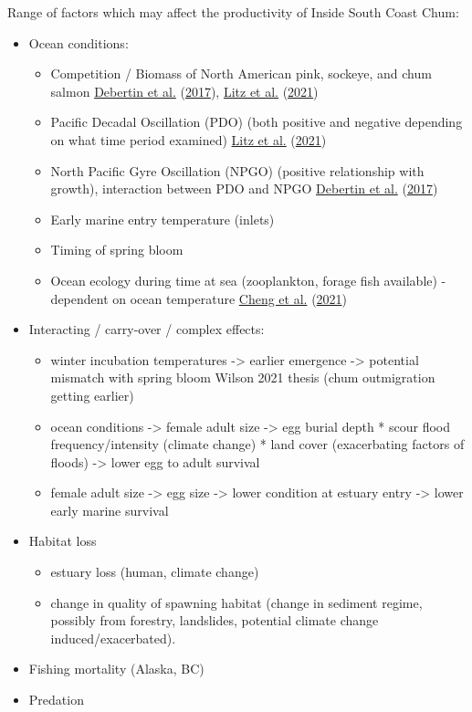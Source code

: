 \documentclass[11pt]{book}
\begin{document}
Range of factors which may affect the productivity of Inside South Coast Chum:
\begin{itemize}

\item
  Ocean conditions:
  \begin{itemize}

  \item
    Competition / Biomass of North American pink, sockeye, and chum salmon \protect\hyperlink{ref-debertin_marine_2017}{Debertin et al.} (\protect\hyperlink{ref-debertin_marine_2017}{2017}), \protect\hyperlink{ref-litz_competition_2021}{Litz et al.} (\protect\hyperlink{ref-litz_competition_2021}{2021})
  \item
    Pacific Decadal Oscillation (PDO) (both positive and negative depending on what time period examined) \protect\hyperlink{ref-litz_competition_2021}{Litz et al.} (\protect\hyperlink{ref-litz_competition_2021}{2021})
  \item
    North Pacific Gyre Oscillation (NPGO) (positive relationship with growth), interaction between PDO and NPGO \protect\hyperlink{ref-debertin_marine_2017}{Debertin et al.} (\protect\hyperlink{ref-debertin_marine_2017}{2017})
  \item
    Early marine entry temperature (inlets)
  \item
    Timing of spring bloom
  \item
    Ocean ecology during time at sea (zooplankton, forage fish available) - dependent on ocean temperature \protect\hyperlink{ref-cheng_upper_2021}{Cheng et al.} (\protect\hyperlink{ref-cheng_upper_2021}{2021})
  \end{itemize}
\item
  Interacting / carry-over / complex effects:
  \begin{itemize}

  \item
    winter incubation temperatures -\textgreater{} earlier emergence -\textgreater{} potential mismatch with spring bloom Wilson 2021 thesis (chum outmigration getting earlier)
  \item
    ocean conditions -\textgreater{} female adult size -\textgreater{} egg burial depth * scour flood frequency/intensity (climate change) * land cover (exacerbating factors of floods) -\textgreater{} lower egg to adult survival
  \item
    female adult size -\textgreater{} egg size -\textgreater{} lower condition at estuary entry -\textgreater{} lower early marine survival
  \end{itemize}
\item
  Habitat loss
  \begin{itemize}

  \item
    estuary loss (human, climate change)
  \item
    change in quality of spawning habitat (change in sediment regime, possibly from forestry, landslides, potential climate change induced/exacerbated).
  \end{itemize}
\item
  Fishing mortality (Alaska, BC)
\item
  Predation
\end{itemize}
\end{document}
